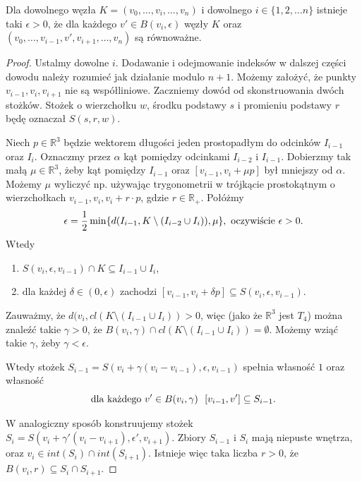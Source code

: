 \begin{lemat}
\label{LEM1}
 Dla dowolnego węzła $K = (v_0, \ldots, v_i, \ldots, v_n)$ i dowolnego $i\in\lbrace 1,2,\ldots n\rbrace$ istnieje taki $\epsilon > 0$, że dla każdego $v'\in B(v_i, \epsilon)$ 
 węzły $K$ oraz $(v_0, \ldots,v_{i-1}, v', v_{i+1}, \ldots, v_n)$ są równoważne.
\end{lemat}
\begin{proof}

Ustalmy dowolne $i$. Dodawanie i odejmowanie indeksów w dalszej części dowodu należy rozumieć jak działanie modulo $n+1$. Możemy założyć, że punkty $v_{i-1}, v_i, v_{i+1}$ nie są
współliniowe. Zaczniemy dowód od skonstruowania dwóch stożków.
Stożek o wierzchołku $w$, środku podstawy $s$ i promieniu podstawy $r$ będę oznaczał $S(s,r,w)$. 

Niech $p\in\mathbb{R}^3$ będzie wektorem długości jeden prostopadłym do odcinków $I_{i-1}$ oraz $I_i$. Oznaczmy przez $\alpha$ kąt pomiędzy odcinkami 
$I_{i-2}$ i $I_{i-1}$. 
Dobierzmy tak małą $\mu\in\mathbb{R}^3$, żeby kąt pomiędzy $I_{i-1}$ oraz $[v_{i-1}, v_i + \mu p]$ był mniejszy od $\alpha$. Możemy $\mu$ wyliczyć np. używając trygonometrii 
w trójkącie prostokątnym o wierzchołkach $v_{i-1}, v_i, v_i + r\cdot p$, gdzie $r\in\mathbb{R}_+$. Połóżmy
\begin{displaymath}
 \epsilon = \frac{1}{2}\min\lbrace d(I_{i-1}, K\setminus(I_{i-2}\cup I_i)), \mu\rbrace, \hbox{ oczywiście }\epsilon>0.
\end{displaymath}
Wtedy
\begin{enumerate}
 \item $S(v_i, \epsilon, v_{i-1})\cap K \subseteq I_{i-1}\cup I_i$,
 \item dla każdej $\delta\in(0,\epsilon)$ zachodzi $[v_{i-1}, v_i+\delta p]\subseteq S(v_i, \epsilon, v_{i-1})$.
\end{enumerate}
Zauważmy, że $d(v_i, cl(K\setminus(I_{i-1}\cup I_i)) > 0$, więc (jako że $\mathbb{R}^3$ jest $T_4$) można znaleźć takie
$\gamma > 0$, że $B(v_i,\gamma)\cap cl(K\setminus(I_{i-1}\cup I_i)) = \emptyset$. Możemy wziąć takie $\gamma$, żeby $\gamma < \epsilon$.

Wtedy stożek 
$S_{i-1} = S(v_i + \gamma(v_i-v_{i-1}), \epsilon, v_{i-1})$ spełnia własność $1$ oraz własność
\begin{displaymath}
 \hbox{dla każdego }v'\in B(v_i, \gamma) \ \ [v_{i-1}, v']\subseteq S_{i-1}.
\end{displaymath}


W analogiczny sposób konstruujemy stożek $S_i = S(v_i + \gamma'(v_i - v_{i+1}), \epsilon', v_{i+1})$. Zbiory $S_{i-1}$ i $S_i$ mają niepuste wnętrza, oraz 
$v_i\in int(S_i)\cap int(S_{i+1})$. Istnieje więc taka liczba $r>0$, że $B(v_i, r)\subseteq S_i\cap S_{i+1}$.


\end{proof}
